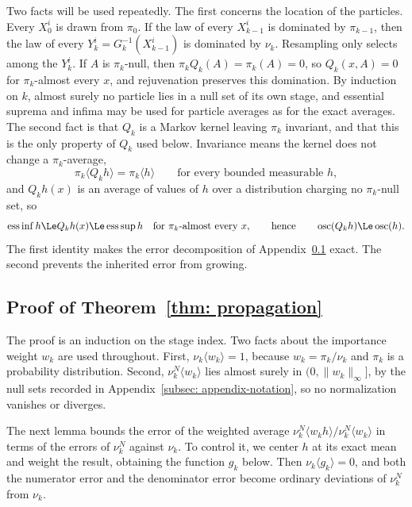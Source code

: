 \documentclass{article}
\begin{document}
Two facts will be used repeatedly. The first concerns the location of the particles. Every $X_0^i$ is drawn from $\pi_0$. If the law of every $X_{k-1}^i$ is dominated by $\pi_{k-1}$, then the law of every $Y_k^i=G_k^{-1}(X_{k-1}^i)$ is dominated by $\nu_k$. Resampling only selects among the $Y_k^i$. If $A$ is $\pi_k$-null, then $\pi_kQ_k(A)=\pi_k(A)=0$, so $Q_k(x,A)=0$ for $\pi_k$-almost every $x$, and rejuvenation preserves this domination. By induction on $k$, almost surely no particle lies in a null set of its own stage, and essential suprema and infima may be used for particle averages as for the exact averages. The second fact is that $Q_k$ is a Markov kernel leaving $\pi_k$ invariant, and that this is the only property of $Q_k$ used below. Invariance means the kernel does not change a $\pi_k$-average,
\begin{equation}
    \pi_k\langle Q_kh\rangle = \pi_k\langle h\rangle
    \qquad\text{for every bounded measurable } h ,
    \label{eq: appendix-invariance}
\end{equation}
and $Q_kh(x)$ is an average of values of $h$ over a distribution charging no $\pi_k$-null set, so
\begin{equation}
    \operatorname{ess\,inf}h \Le Q_kh(x) \Le \operatorname{ess\,sup}h
    \quad\text{for } \pi_k\text{-almost every } x ,
    \qquad\text{hence}\qquad
    \operatorname{osc}(Q_kh) \Le \operatorname{osc}(h) .
    \label{eq: appendix-contraction}
\end{equation}
The first identity makes the error decomposition of Appendix~\ref{subsec: appendix-proof} exact. The second prevents the inherited error from growing.

\subsection{Proof of Theorem~\ref{thm: propagation}}
\label{subsec: appendix-proof}

The proof is an induction on the stage index. Two facts about the importance weight $w_k$ are used throughout. First, $\nu_k\langle w_k\rangle = 1$, because $w_k=\pi_k/\nu_k$ and $\pi_k$ is a probability distribution. Second, $\nu_k^N\langle w_k\rangle$ lies almost surely in $(0,\lVert w_k\rVert_\infty]$, by the null sets recorded in Appendix~\ref{subsec: appendix-notation}, so no normalization vanishes or diverges.

The next lemma bounds the error of the weighted average $\nu_k^N\langle w_kh\rangle/\nu_k^N\langle w_k\rangle$ in terms of the errors of $\nu_k^N$ against $\nu_k$. To control it, we center $h$ at its exact mean and weight the result, obtaining the function $g_k$ below. Then $\nu_k\langle g_k\rangle=0$, and both the numerator error and the denominator error become ordinary deviations of $\nu_k^N$ from $\nu_k$.
\end{document}
